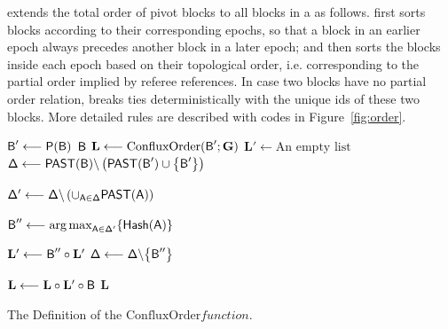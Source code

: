 {\name} extends the total order of pivot blocks to all blocks in a \tg as follows.
{\name} first sorts blocks according to their corresponding epochs, so that a block in an earlier epoch always precedes another block in a later epoch;
and then {\name} sorts the blocks inside each epoch based on their topological order, i.e. corresponding to the partial order implied by referee references.
In case two blocks have no partial order relation, {\name} breaks ties deterministically with the unique ids of these two blocks. 
{More detailed rules are described with codes in Figure~\ref{fig:order}.}

\begin{algorithm}[!htb]
	\small
	\SetNlSty{}{}{}
	\DontPrintSemicolon
	\let\oldnl\nl%
	\newcommand{\nonl}{\renewcommand{\nl}{\let\nl\oldnl}}%
	
	$\textsf{B}' \longleftarrow \mathsf{P}(\textsf{B})$\;
	 {
		\Return $\textsf{B}$\;
	}
	$\mathbf{L} \longleftarrow \mathrm{ConfluxOrder}( \textsf{B}';\textbf{G})$\;
	$\mathbf{L}' \longleftarrow \text{An empty list}$\;
	$\mathsf{\Delta} \longleftarrow \mathsf{PAST}(\textsf{B}) \backslash \left(\mathsf{PAST}(\textsf{B}') \cup {\left \{{\textsf{B}'} \right \}}\right)$\;
	\While {$\mathsf{\Delta} \neq \varnothing$} {
		$\mathsf{\Delta}' \longleftarrow \mathsf{\Delta} \backslash\left(\cup_{\textsf{A} \in \mathsf{\Delta}} \mathsf{PAST}(\textsf{A}) \right)$\;

		
		$\textsf{B}''\longleftarrow {\arg\max}_{\textsf{A}\in\mathsf{\Delta'}}{\left \{{\mathsf{Hash}(\textsf{A})} \right \}}$\;

		$\mathbf{L}' \longleftarrow \textsf{B}'' \circ \mathbf{L}'$ \;
		$\mathsf{\Delta} \longleftarrow \mathsf{\Delta} \backslash {\left \{{\textsf{B}''} \right \}}$\;
	}
	$\mathbf{L}  \longleftarrow \mathbf{L} \circ \mathbf{L}' \circ \textsf{B}$\;
	\Return $\mathbf{L}$\;
	\caption{The Definition of the $\mathrm{ConfluxOrder} function$.}
	\label{fig:order}
\end{algorithm}

